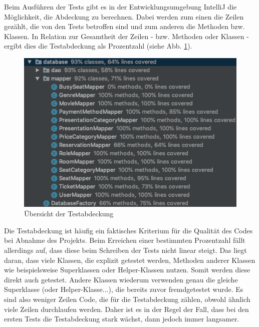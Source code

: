 	Beim Ausführen der Tests gibt es in der Entwicklungsumgebung IntelliJ die Möglichkeit, die Abdeckung zu berechnen. Dabei werden zum einen die Zeilen gezählt, die von den Tests betroffen sind und zum anderen die Methoden bzw. Klassen. In Relation zur Gesamtheit der Zeilen - bzw. Methoden oder Klassen - ergibt dies die Testabdeckung als Prozentzahl (siehe Abb. \ref{fig:TestCoverage}).\newline
	\begin{figure} [H]
		\centering 
		\includegraphics[scale=0.6]{img/testCoverage.png}
		\captionsetup{format=hang}
		\centering\caption[Testabdeckung]{\label{fig:TestCoverage} Übersicht der Testabdeckung}
	\end{figure}
	Die Testabdeckung ist häufig ein faktisches Kriterium für die Qualität des Codes bei Abnahme des Projekts. Beim Erreichen einer bestimmten Prozentzahl fällt allerdings auf, dass diese beim Schreiben der Tests nicht linear steigt. Das liegt daran, dass viele Klassen, die explizit getestet werden, Methoden anderer Klassen wie beispielsweise Superklassen oder Helper-Klassen nutzen. Somit werden diese direkt auch getestet. Andere Klassen wiederum verwenden genau die gleiche Superklasse (oder Helper-Klasse...), die bereits zuvor fremdgetestet wurde. Es sind also weniger Zeilen Code, die für die Testabdeckung zählen, obwohl ähnlich viele Zeilen durchlaufen werden. Daher ist es in der Regel der Fall, dass bei den ersten Tests die Testabdeckung stark wächst, dann jedoch immer langsamer.
	
	
	